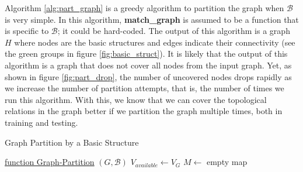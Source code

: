 \documentclass[10pt, titlepage]{article}
\theoremstyle{definition}
\begin{document}
Algorithm \ref{alg:part_graph} is a greedy algorithm to partition the graph when $\mathcal{B}$ is very simple. In this algorithm, \textbf{match\_graph} is assumed to be a function that is specific to $\mathcal{B}$; it could be hard-coded. The output of this algorithm is a graph $H$ where nodes are the basic structures and edges indicate their connectivity (see the green groups in figure \ref{fig:basic_struct}). It is likely that the output of this algorithm is a graph that does not cover all nodes from the input graph. Yet, as shown in figure \ref{fig:part_drop}, the number of uncovered nodes drops rapidly as we increase the number of partition attempts, that is, the number of times we run this algorithm. With this, we know that we can cover the topological relations in the graph better if we partition the graph multiple times, both in training and testing.

\begin{algorithm}
    \caption{Graph Partition by a Basic Structure}
    \label{alg:part_graph}

    \underline{function Graph-Partition} $(G, \mathcal{B})$\;
    $V_{available}\gets V_G$\;
    $M \gets$ empty map\;
\end{algorithm}
\end{document}
